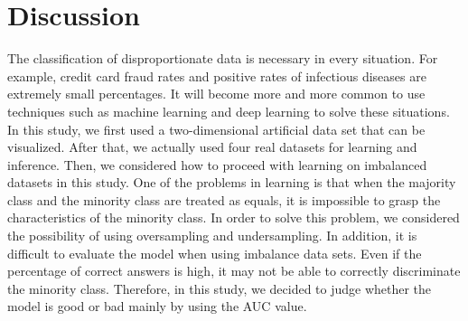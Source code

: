 \chapter{Discussion}

The classification of disproportionate data is necessary in every situation.
For example, credit card fraud rates and positive rates of infectious diseases are extremely small percentages.
It will become more and more common to use techniques such as machine learning and deep learning to solve these situations.
In this study, we first used a two-dimensional artificial data set that can be visualized. After that, we actually used four real datasets for learning and inference.
Then, we considered how to proceed with learning on imbalanced datasets in this study.
One of the problems in learning is that when the majority class and the minority class are treated as equals, it is impossible to grasp the characteristics of the minority class.
In order to solve this problem, we considered the possibility of using oversampling and undersampling.
In addition, it is difficult to evaluate the model when using imbalance data sets.
Even if the percentage of correct answers is high, it may not be able to correctly discriminate the minority class.
Therefore, in this study, we decided to judge whether the model is good or bad mainly by using the AUC value\cite{ROC}.

